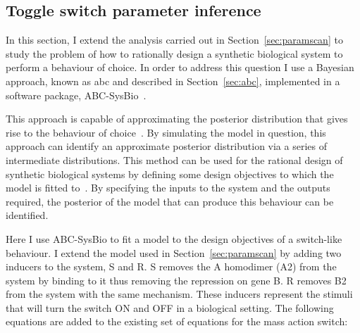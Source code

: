 \subsection{Toggle switch parameter inference}
\label{sec:param_inf}
In this section, I extend the analysis carried out in Section~\ref{sec:paramscan} to study the problem of how to rationally design a synthetic biological system to perform a behaviour of choice.  In order to address this question I use a Bayesian approach, known as \acrlong{abc} and described in Section~\ref{sec:abc}, implemented in a software package, ABC-SysBio~\autocite{Liepe:2010eg}. 

This approach is capable of approximating the posterior distribution that gives rise to the behaviour of choice~\autocite{Toni:2009tr}. By simulating the model in question, this approach can identify an approximate posterior distribution via a series of intermediate distributions. This method can be used for the rational design of synthetic biological systems by defining some design objectives to which the model is fitted to~\autocite{Barnes:2011hh}. By specifying the inputs to the system and the outputs required, the posterior of the model that can produce this behaviour can be identified. 

Here I use ABC-SysBio to fit a model to the design objectives of a switch-like behaviour. I extend the model used in Section~\ref{sec:paramscan} by adding two inducers to the system, S and R. S removes the A homodimer (A2) from the system by binding to it thus removing the repression on gene B. R removes B2 from the system with the same mechanism. These inducers represent the stimuli that will turn the switch ON and OFF in a biological setting. The following equations are added to the existing set of equations for the mass action switch: 

